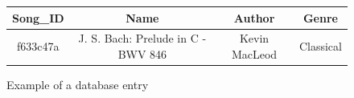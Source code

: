\begin{figure}
    \centering
    \begin{tabular}{|c|c|c|c|}
        \hline
        Song\_ID & Name & Author & Genre \\
        \hline
        f633c47a & J. S. Bach: Prelude in C - BWV 846  & Kevin MacLeod & Classical \\
        \hline
    \end{tabular}
    \caption{Example of a database entry}
    \label{fig:database}
\end{figure}
